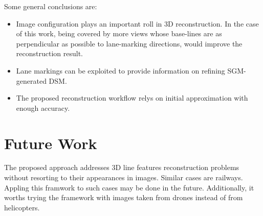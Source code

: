 
Some general conclusions are:
\begin{itemize}
	\item Image configuration plays an important roll in 3D reconstruction. In the case of this work, being covered by more views whose base-lines are as perpendicular as possible to lane-marking directions, would improve the reconstruction result.
	
	\item Lane markings can be exploited to provide information on refining SGM-generated DSM.%

	\item The proposed reconstruction workflow relys on initial approximation with enough accuracy.
\end{itemize}





\section*{Future Work}
\label{chap:futurework}



The proposed approach addresses 3D line features reconstruction problems without resorting to their appearances in images. Similar cases are railways. Appling this framwork to such cases may be done in the future. Additionally, it worths trying the framework with images taken from drones instead of from helicopters.

